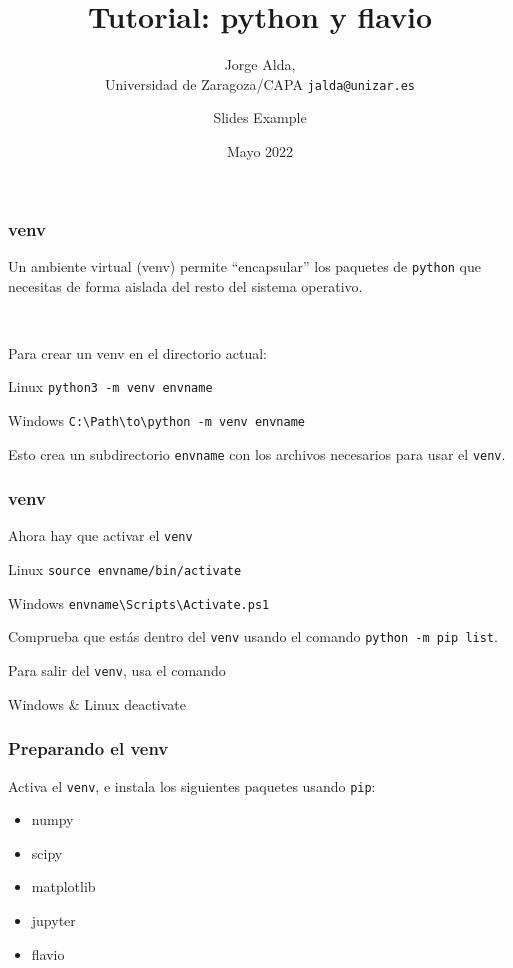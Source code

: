 \documentclass[mathserif, 10pt]{beamer}
\title{Tutorial: python y flavio}
\subtitle{Jorge Alda,\\ Universidad de Zaragoza/CAPA\hspace{4em} \texttt{jalda@unizar.es} }
\author[Jorge Alda]{Slides Example}
\date{Mayo 2022}
\begin{document}
\begin{frame}

    \titlepage

\end{frame}


\begin{frame}\frametitle{venv}
    Un ambiente virtual (venv) permite ``encapsular'' los paquetes de \texttt{python} que necesitas de forma aislada del resto del sistema operativo.

    ~

    Para crear un venv en el directorio actual:
    \begin{block}{Linux}
        \texttt{python3 -m venv envname}
    \end{block}
    \begin{block}{Windows}
        \texttt{C:\textbackslash Path\textbackslash to\textbackslash python -m venv envname}
    \end{block}

    Esto crea un subdirectorio \texttt{envname} con los archivos necesarios para usar el \texttt{venv}.
\end{frame}

\begin{frame}\frametitle{venv}

Ahora hay que activar el \texttt{venv}
    \begin{block}{Linux}
        \texttt{source envname/bin/activate}
    \end{block}
    \begin{block}{Windows}
        \texttt{envname\textbackslash Scripts\textbackslash Activate.ps1}
    \end{block}

    Comprueba que estás dentro del \texttt{venv} usando el comando \texttt{python -m pip list}.

    Para salir del \texttt{venv}, usa el comando
    \begin{block}{Windows \& Linux}
        deactivate
    \end{block}
\end{frame}

\begin{frame}\frametitle{Preparando el venv}
    Activa el \texttt{venv}, e instala los siguientes paquetes usando \texttt{pip}:
    \begin{itemize}
        \item numpy
        \item scipy
        \item matplotlib
\item jupyter
        \item flavio
    \end{itemize}
\end{frame}
\end{document}
